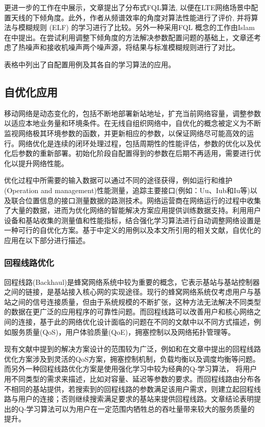 \documentclass{IEEEtran}
\begin{document}
更进一步的工作在\cite{Razavi2010a}中展示，文章提出了分布式FQL算法, 以便在LTE网络场景中配置天线的下倾角度。此外，作者从频谱效率的角度对算法性能进行了评价, 并将算法与模糊规则 (ELF) 的学习进行了比较。另外一种采用FQL 概念的工作由Islam 在\cite{Islam2012}中提出。在尝试利用调整下倾角度的方法解决参数配置问题的基础上，文章还考虑了热噪声和接收机噪声两个噪声源，将结果与标准模糊规则进行了对比。

表格中列出了自配置用例及其各自的学习算法的应用。


\subsection{自优化应用}
\label{sec:self-optimization}
移动网络是动态变化的，包括不断地部署新站地址，扩充当前网络容量，调整参数以适应本地业务量和环境条件。在无线自组织网络中，自优化的概念被定义为不断监视网络极其环境参数的函数，并更新相应的参数，以保证网络尽可能高效的运行\cite{Aliu2013}。网络优化是连续的闭环处理过程，包括周期性的性能评估，参数的优化以及优化后参数的重新部署。初始化阶段自配置得到的参数在后期不再适用，需要进行优化以提升网络性能。%

优化过程中所需要的输入数据可以通过不同的途径获得，例如运行和维护(Operation and management)性能测量，追踪主要接口(例如：Uu、Iub和Iu等)以及联合位置信息的接口测量数据的路测技术。网络运营商在网络运行的过程中收集了大量的数据，进而为优化网络的智能解决方案应用提供训练数据支持。利用用户设备和基站收集的测量值和性能指标，结合强化学习算法进行自动调整网络设置是一种可行的自优化方案。基于\cite{3gpp.36.902}中定义的用例以及本文所引用的相关文献，自优化的应用在以下部分进行描述。

\subsubsection{回程线路优化}

回程线路(Backhaul)是蜂窝网络系统中较为重要的概念，它表示基站与基站控制器之间的链接，是基站接入核心网的实现途径。现行的蜂窝网络系统仅考虑用户与基站之间的信号连接质量，但由于系统规模的不断扩张，这种方法无法解决不同类型的数据在更广泛的应用程序的可靠性问题。而回程线路可以改善用户和核心网络之间的连接，基于此的网络优化设计面临的问题在不同的文献中以不同方式描述，例如服务质量(QoS)，用户体验质量(QoE)，拥塞控制以及网络拓扑管理等。

现有文献中提到的解决方案设计的范围较为广泛，例如\cite{Wainio2016}和\cite{Chen2015}在文章中提出的回程线路优化方案涉及到灵活的QoS方案，拥塞控制机制，负载均衡以及调度均衡等问题。而另外一种回程线路优化方案是使用强化学习中较为经典的Q-学习算法，\cite{Jaber2015}\cite{Jaber2016a}\cite{Jaber2016c} 将用户用不同类型的需求来描述，比如对容量、延迟等参数的要求。而回程线路由分布各不相同的基站提供，若搜索到的回程线路的参数满足该用户需求，则建立起回程线路与用户的连接；否则继续搜索满足要求的基站来提供回程线路。文章结论表明提出的Q-学习算法可以为用户在一定范围内牺牲总的吞吐量带来较大的服务质量的提升。
\end{document}
